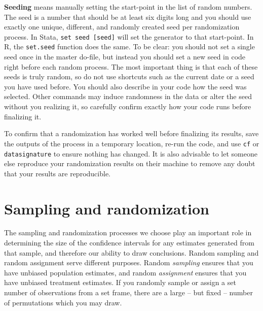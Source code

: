 \textbf{Seeding} means manually setting the start-point in the list of random numbers.
The seed is a number that should be at least six digits long and you should use exactly
one unique, different, and randomly created seed per randomization process.
In Stata, \texttt{set seed [seed]} will set the generator to that start-point. In R, the \texttt{set.seed} function does the same.
To be clear: you should not set a single seed once in the master do-file,
but instead you should set a new seed in code right before each random process.
The most important thing is that each of these seeds is truly random,
so do not use shortcuts such as the current date or a seed you have used before.
You should also describe in your code how the seed was selected.
Other commands may induce randomness in the data or alter the seed without you realizing it,
so carefully confirm exactly how your code runs before finalizing it.

To confirm that a randomization has worked well before finalizing its results,
save the outputs of the process in a temporary location,
re-run the code, and use \texttt{cf} or \texttt{datasignature} to ensure
nothing has changed. It is also advisable to let someone else reproduce your
randomization results on their machine to remove any doubt that your results
are reproducible.





\section{Sampling and randomization}

The sampling and randomization processes we choose
play an important role in determining the size of the confidence intervals
for any estimates generated from that sample,
and therefore our ability to draw conclusions.
Random sampling and random assignment serve different purposes.
Random \textit{sampling} ensures that you have unbiased population estimates,
and random \textit{assignment} ensures that you have unbiased treatment estimates.
If you randomly sample or assign a set number of observations from a set frame,
there are a large -- but fixed -- number of permutations which you may draw.

